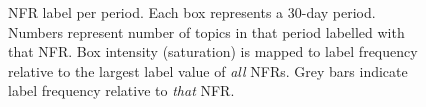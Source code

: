 \documentclass[]{sig-alternate}
\begin{document}

\begin{figure}[ht]
\centering
{}                                                        
\label{fig:timelines}
\caption[]{NFR label per period. Each box represents a 30-day period. Numbers represent number of topics in that period labelled with that NFR. Box intensity (saturation) is mapped to label frequency relative to the largest label value of \emph{all} NFRs. Grey bars indicate label frequency relative to \emph{that} NFR.
}
\end{figure}


% 
% 
\end{document}
